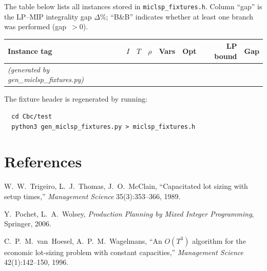 \documentclass[11pt,a4paper]{article}
\begin{document}
The table below lists all instances stored in \texttt{miclsp\_fixtures.h}.
Column ``gap'' is the LP--MIP integrality gap $\Delta\%$; ``B\&B'' indicates
whether at least one branch was performed (gap~$>0$).

\begin{center}
\begin{tabular}{@{}lcccccrl@{}}
\toprule
\textbf{Instance tag} & $I$ & $T$ & $\rho$ & \textbf{Vars} &
  \textbf{Opt} & \textbf{LP bound} & \textbf{Gap}\\
\midrule
\emph{(generated by gen\_miclsp\_fixtures.py)} & & & & & & &\\
\bottomrule
\end{tabular}
\end{center}

The fixture header is regenerated by running:
\begin{verbatim}
  cd Cbc/test
  python3 gen_miclsp_fixtures.py > miclsp_fixtures.h
\end{verbatim}

\section*{References}

\begin{enumerate}[leftmargin=2em,label={[\arabic*]}]
  \item W.~W.~Trigeiro, L.~J.~Thomas, J.~O.~McClain,
    ``Capacitated lot sizing with setup times,''
    \textit{Management Science} 35(3):353--366, 1989.
  \item Y.~Pochet, L.~A.~Wolsey,
    \textit{Production Planning by Mixed Integer Programming},
    Springer, 2006.
  \item C.~P.~M.~van~Hoesel, A.~P.~M.~Wagelmans,
    ``An $O(T^3)$ algorithm for the economic lot-sizing problem
    with constant capacities,''
    \textit{Management Science} 42(1):142--150, 1996.
\end{enumerate}
\end{document}
